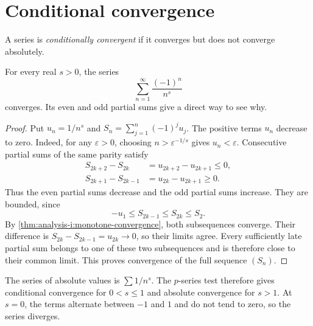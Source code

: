 \section{Conditional convergence}
\label{sec:analysis-i:conditional-convergence}

\begin{definition}
  A series is \emph{conditionally convergent} if it converges but
  does not converge absolutely.
\end{definition}

\begin{example}
  \label{ex:analysis-i:alternating-power-series}
  For every real $s>0$, the series
  \[
    \sum_{n=1}^{\infty}\frac{(-1)^n}{n^s}
  \]
  converges. Its even and odd partial sums give a direct way to see why.

  \begin{proof}
    Put $u_n=1/n^s$ and $S_n=\sum_{j=1}^n(-1)^ju_j$.
    The positive terms $u_n$ decrease to zero. Indeed, for any
    $\varepsilon>0$, choosing $n>\varepsilon^{-1/s}$ gives
    $u_n<\varepsilon$. Consecutive partial sums of the same parity satisfy
    \begin{align*}
      S_{2k+2}-S_{2k}&=u_{2k+2}-u_{2k+1}\le0,\\
      S_{2k+1}-S_{2k-1}&=u_{2k}-u_{2k+1}\ge0.
    \end{align*}
    Thus the even partial sums decrease and the odd partial sums increase.
    They are bounded, since
    \[
      -u_1\le S_{2k-1}\le S_{2k}\le S_2.
    \]
    By \autoref{thm:analysis-i:monotone-convergence}, both subsequences
    converge. Their difference is $S_{2k}-S_{2k-1}=u_{2k}\to0$, so
    their limits agree. Every sufficiently late partial sum belongs to
    one of these two subsequences and is therefore close to their common
    limit. This proves convergence of the full sequence $(S_n)$.
  \end{proof}

  The series of absolute values is $\sum 1/n^s$. The $p$-series test
  therefore gives conditional convergence for $0<s\le1$ and absolute
  convergence for $s>1$. At $s=0$, the terms alternate between $-1$
  and $1$ and do not tend to zero, so the series diverges.
\end{example}

